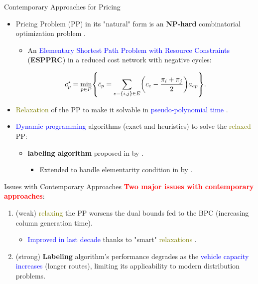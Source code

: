 \begin{frame}{Contemporary Approaches for Pricing}
	\begin{itemize}[<+->]
		\item Pricing Problem (PP) in its "natural" form is an \textbf{NP-hard} combinatorial optimization problem \parencite{dror1994}.
		      \begin{itemize}[<.->]
			      \item An \textcolor{blue}{Elementary Shortest Path Problem with Resource Constraints} (\textbf{ESPPRC}) in a reduced cost network with negative cycles:
		      \end{itemize}
		      \begin{equation}\label{eq:pp-problem}
			      {c^\star_p} = \min_{p \in P} \Set*{ \bar{c}_p = \sum_{e = \Set*{i, j} \in E} \Expr*{c_{e} - \frac{\pi_i + \pi_j}{2}} a_{ep}  }.
		      \end{equation}
		\item \textcolor{olive}{Relaxation} of the PP to make it solvable in \textcolor{blue}{pseudo-polynomial time} \parencite{desrochers1988, irnich2005}.
		\item \textcolor{blue}{Dynamic programming} algorithms (exact and heuristics) to solve the \textcolor{olive}{relaxed} PP:
		      \begin{itemize}[<.->]
			      \item \textbf{labeling algorithm} proposed in \citeyear{desrochers1992} by \textcite{desrochers1992}.
			            \begin{itemize}[<.->]
				            \item Extended to handle elementarity condition in \citeyear{feillet2004} by \textcite{feillet2004}.
			            \end{itemize}
		      \end{itemize}

	\end{itemize}
\end{frame}

\begin{frame}{Issues with Contemporary Approaches}
	\textcolor{red}{\textbf{Two major issues with contemporary approaches}}:
	\begin{enumerate}
		\item (weak) \textcolor{olive}{relaxing} the PP worsens the dual bounds fed to the BPC (increasing column generation time).
		      \begin{itemize}[<.->]
			      \item \textcolor{blue}{Improved in last decade} thanks to "smart" \textcolor{olive}{relaxations} \parencite{baldacci2011}.
		      \end{itemize}
		\item (strong) \textbf{Labeling} algorithm's performance degrades as the \textcolor{blue}{vehicle capacity increases} (longer routes), limiting its applicability to modern distribution problems.
	\end{enumerate}
\end{frame}

